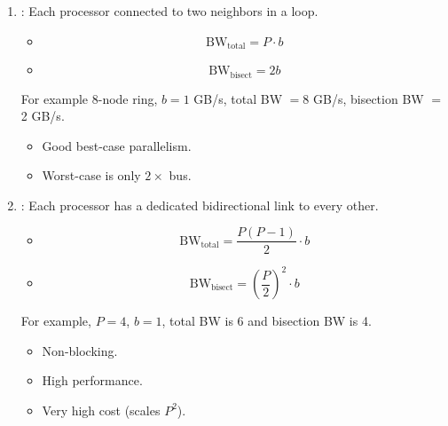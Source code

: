 \begin{enumerate}
    \item {}: Each processor connected to two neighbors in a loop.
    \begin{itemize}
        \item {}
        \begin{equation}
            \text{BW}_{\text{total}} = P \cdot b
        \end{equation}
        \item {}
        \begin{equation}
            \text{BW}_{\text{bisect}} = 2b
        \end{equation}
    \end{itemize}
    For example 8-node ring, $b = 1$ GB/s, total BW $=8$ GB/s, bisection BW $=$ 2 GB/s. 
    \begin{itemize}
        \item[\textcolor{Green3}{\faIcon{check}}] Good best-case parallelism.
        \item[\textcolor{Red2}{\faIcon{times}}] Worst-case is only $2\times$ bus.
    \end{itemize}

    \item {}: Each processor has a dedicated bidirectional link to every other.
    \begin{itemize}
        \item {}
        \begin{equation}
            \text{BW}_{\text{total}} = \dfrac{P \left(P-1\right)}{2} \cdot b
        \end{equation}
        \item {}
        \begin{equation}
            \text{BW}_{\text{bisect}} = \left(\dfrac{P}{2}\right)^{2} \cdot b
        \end{equation}
    \end{itemize}
    For example, $P = 4$, $b = 1$, total BW is 6 and bisection BW is 4.
    \begin{itemize}
        \item[\textcolor{Green3}{\faIcon{check}}] Non-blocking.
        \item[\textcolor{Green3}{\faIcon{check}}] High performance.
        \item[\textcolor{Red2}{\faIcon{times}}] Very high cost (scales $P^2$).
    \end{itemize}
    

\end{enumerate}
